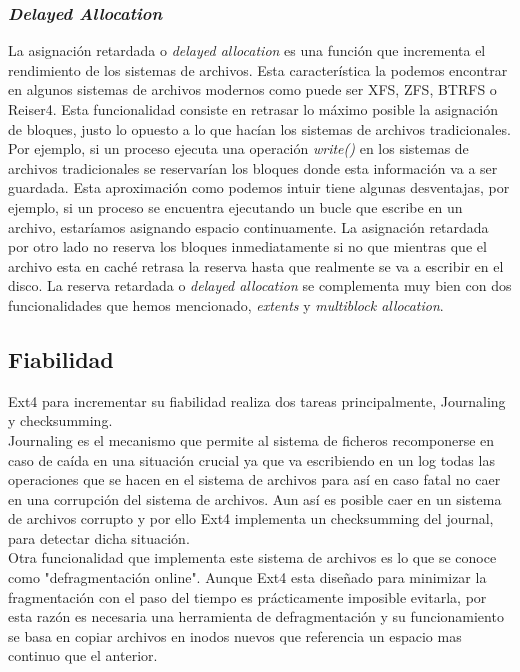 \subsubsection{\textit{Delayed Allocation}}
La asignación retardada o \textit{delayed allocation} es una función que incrementa el rendimiento de los sistemas de archivos. Esta característica la podemos encontrar en algunos sistemas de archivos modernos como puede ser XFS, ZFS, BTRFS o Reiser4. Esta funcionalidad consiste en retrasar lo máximo posible la asignación de bloques, justo lo opuesto a lo que hacían los sistemas de archivos tradicionales. Por ejemplo, si un proceso ejecuta una operación \textit{write()} en los sistemas de archivos tradicionales se reservarían los bloques donde esta información va a ser guardada. Esta aproximación como podemos intuir tiene algunas desventajas, por ejemplo, si un proceso se encuentra ejecutando un bucle que escribe en un archivo, estaríamos asignando espacio continuamente. La asignación retardada por otro lado no reserva los bloques inmediatamente si no que mientras que el archivo esta en caché retrasa la reserva hasta que realmente se va a escribir en el disco. 
La reserva retardada o \textit{delayed allocation} se complementa muy bien con dos funcionalidades que hemos mencionado, \textit{extents} y \textit{multiblock allocation}. \cite{ext4howto}




\subsection{Fiabilidad}
Ext4 para incrementar su fiabilidad realiza dos tareas principalmente, Journaling y checksumming.\\

Journaling es el mecanismo que permite al sistema de ficheros recomponerse en caso de caída en una situación crucial ya que va escribiendo en un log todas las operaciones que se hacen en el sistema de archivos para así en caso fatal no caer en una corrupción del sistema de archivos. Aun así es posible caer en un sistema de archivos corrupto y por ello Ext4 implementa un checksumming del journal, para detectar dicha situación.\\

Otra funcionalidad que implementa este sistema de archivos es lo que se conoce como "defragmentación online". Aunque Ext4 esta diseñado para minimizar la fragmentación con el paso del tiempo es prácticamente imposible evitarla, por esta razón es necesaria una herramienta de defragmentación y su funcionamiento se basa en copiar archivos en inodos nuevos que referencia un espacio mas continuo que el anterior.



